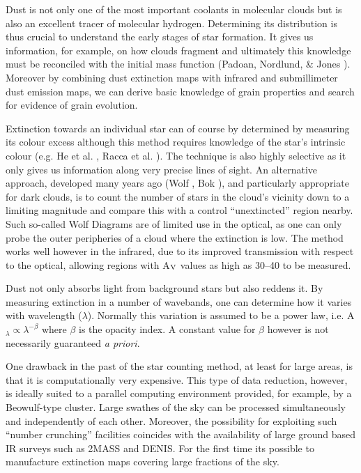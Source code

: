 \documentclass{aa}
\begin{document}
Dust is not only one of the most important coolants in molecular clouds but is
also an excellent tracer of molecular hydrogen. Determining its distribution is
thus crucial to understand the early stages of star formation. It gives us
information, for example, on how clouds fragment and ultimately this knowledge
must be reconciled with the initial mass function  (Padoan, Nordlund, \& Jones
\cite{1997MNRAS.288..145P}). Moreover by combining dust extinction maps with
infrared and submillimeter dust emission maps, we can derive basic knowledge of
grain properties and search for evidence of grain evolution.  

Extinction towards an individual star can of course by determined by measuring
its colour excess although this method requires knowledge of the star's
intrinsic colour (e.g. He et al. \cite{1995ApJS..101..335H}, Racca et al.
\cite{2002AJ....124.2178R}). The technique is also highly selective as it only
gives us information along very precise lines of sight. An alternative
approach, developed many years ago (Wolf \cite{1923AN....219..109W}, Bok 
\cite{1956AJ.....61..309B}), and particularly appropriate for dark clouds, is 
to count the number of stars in the cloud's vicinity down to a limiting 
magnitude and compare this with a control ``unextincted'' region nearby. Such
so-called Wolf Diagrams are of limited use in the optical, as one can only
probe the outer peripheries of a cloud where the extinction is low. The method
works well however in the infrared, due to its improved transmission with
respect to the optical, allowing regions with A$_{\rm V}$ values as high as
30--40 to be measured. 

Dust not only absorbs light from background stars but also reddens it. By 
measuring extinction in a number of wavebands, one can determine how it varies
with wavelength ($\lambda$). Normally this variation is assumed to be a power
law, i.e. A$_\lambda \propto \lambda^{-\beta}$  where $\beta$ is the opacity
index. A constant value for $\beta$ however is not necessarily guaranteed {\em
a priori}.  

One drawback in the past of the star counting method, at least for large areas,
is that it is computationally very expensive. This type of data reduction,
however, is  ideally suited to a parallel computing environment provided, for
example, by a Beowulf-type cluster. Large swathes of the sky can be processed
simultaneously  and independently of each other. Moreover, the possibility for
exploiting such ``number crunching'' facilities coincides with the availability
of large ground based IR surveys such as 2MASS and DENIS. For the first time
its possible to manufacture extinction maps covering large fractions of the
sky. 
\end{document}
